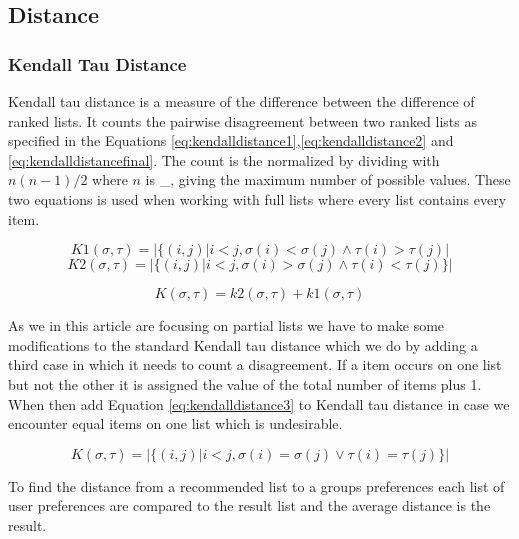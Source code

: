 \subsection{Distance}

\subsubsection{Kendall Tau Distance}
Kendall tau distance is a measure of the difference between the difference of ranked lists\citep{rank:aggregation}. It counts the pairwise disagreement between two ranked lists as specified in the Equations \ref{eq:kendalldistance1},\ref{eq:kendalldistance2} and \ref{eq:kendalldistancefinal}. The count is the normalized by dividing with $n(n-1)/2$ where $n$ is \_, giving the maximum number of possible values. 
These two equations is used when working with full lists where every list contains every item. 

\begin{equation}\label{eq:kendalldistance1}
K1(\sigma,\tau) = | \{(i,j) | i < j, \sigma (i) < \sigma (j) \land \tau (i) > \tau (j)|
\end{equation}
\begin{equation}\label{eq:kendalldistance2}
K2(\sigma,\tau) = | \{(i,j) | i < j, \sigma (i) > \sigma (j) \land \tau (i) < \tau (j) \} |
\end{equation}

\begin{equation}\label{eq:kendalldistancefinal}
K(\sigma,\tau) = k2(\sigma,\tau) + k1(\sigma,\tau)
\end{equation}

As we in this article are focusing on partial lists we have to make some modifications to the standard Kendall tau distance which we do by adding a third case in which it needs to count a disagreement. If a item occurs on one list but not the other it is assigned the value of the total number of items plus 1. When then add Equation \ref{eq:kendalldistance3} to Kendall tau distance in case we encounter equal items on one list which is undesirable. 

\begin{equation}\label{eq:kendalldistance3}
K(\sigma,\tau) = | \{(i,j) | i < j, \sigma (i) = \sigma (j) \lor \tau (i) = \tau (j) \} |
\end{equation}

To find the distance from a recommended list to a groups preferences each list of user preferences are compared to the result list and the average distance is the result. 



